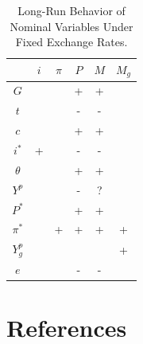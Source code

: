 \documentclass[
  letterpaper,
]{book}
\theoremstyle{plain}
\theoremstyle{remark}
\begin{document}
\begin{table}

\begin{tabular}
{*{6}{|c}|}
\hline


    &$i$    &$\pi$  &$P$    &$M$    &$M_g$      \\ \hline
$G$ &   &   &+  &+  &       \\ \hline
$t$ &   &   &-  &-  &       \\ \hline
$c$ &   &   &+  &+  &       \\ \hline
$i^*$   &+  &   &-  &-  &       \\ \hline
$\theta$    &   &   &+  &+  &   \\ \hline
$Y^p$   &   &   &-  &?  &       \\ \hline
$P^*$   &   &   &+  &+  &       \\ \hline
$\pi^*$ &   &+  &+  &+  &+      \\ \hline
$Y^p_g$ &   &   &   &   &+      \\ \hline
$e$ &   &   &-  &-  &       \\ \hline

\end{tabular}
\caption{Long-Run Behavior of Nominal Variables Under Fixed Exchange Rates.}
\end{table}


\chapter*{References}\label{references}


\printbibliography[heading=none]


\backmatter


\printindex
\end{document}
